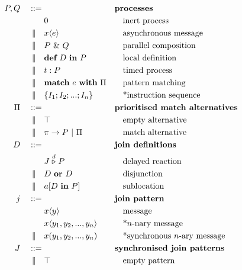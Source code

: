 \begin{figure}
\begin{align*}
P,Q\quad::={}&             && \textbf{processes} \\
          & 0              && \quad\textrm{inert process} \\
 \alt\quad& x\langle e \rangle
                           && \quad\textrm{asynchronous message} \\
 \alt\quad& P~\&~Q         && \quad\textrm{parallel composition} \\
 \alt\quad& \textbf{def}~D~\textbf{in}~P
                           && \quad\textrm{local definition} \\
 \alt\quad& t : P          && \quad\textrm{timed process} \\
 \alt\quad& \textbf{match}~e~\textbf{with}~\Pi
                           && \quad\textrm{pattern matching} \\
 \alt\quad& \{ I_1; I_2; ...; I_n \}
                           && \quad\textrm{*instruction sequence} \\
\Pi\quad ::={}&            && \textbf{prioritised match alternatives} \\
 \alt\quad& \top           && \quad\textrm{empty alternative} \\
 \alt\quad& \pi \rightarrow P ~|~ \Pi
                           && \quad\textrm{match alternative} \\
D\quad ::={}&              && \textbf{join definitions} \\
         & J \stackrel{d}{\triangleright} P
                           && \quad\textrm{delayed reaction} \\
\alt\quad& D~\textbf{or}~D && \quad\textrm{disjunction} \\
\alt\quad& a[D~\textbf{in}~P] && \quad\textrm{sublocation} \\
j\quad ::={}&             && \textbf{join pattern} \\
            & x\langle y \rangle
                           && \quad\textrm{message} \\
            & x\langle y_1, y_2, ..., y_n \rangle
                           && \quad\textrm{*$n$-nary message} \\
\alt\quad& x(y_1, y_2, ..., y_n)
                           && \quad\textrm{*synchronous $n$-ary message} \\
J\quad ::={}&              && \textbf{synchronised join patterns}\\
\alt\quad& \top               && \quad\textrm{empty pattern}\\

\end{align*}
\end{figure}
